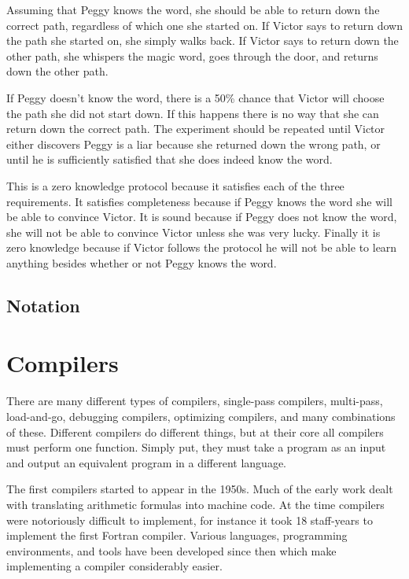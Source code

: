 \documentclass{sig-alternate}
\begin{document}
	Assuming that Peggy knows the word, she should be able to return down
	the correct path, regardless of which one she started on. If Victor 
	says to	return down the path she started on, she simply walks back. 
	If Victor says to return down the other path, she whispers the magic
	word, goes through the door, and returns down the other path.

	If Peggy doesn't know the word, there is a 50\% chance that Victor
	will choose the path she did not start down. If this happens there is
	no way that she can return down the correct path. The experiment should
	be repeated until Victor either discovers Peggy is a liar because she
	returned down the wrong path, or until he is sufficiently satisfied
	that she does indeed know the word.

	This is a zero knowledge protocol because it satisfies each of the three
	requirements. It satisfies completeness because	if Peggy knows the word
	she will be able to convince Victor. It is sound because if Peggy does not 
	know the word, she will not be able to convince Victor unless she was very
	lucky. Finally it is zero knowledge because if Victor follows the protocol
	he will not be able to learn anything besides whether or not Peggy knows 
	the word.
	
	\subsection{Notation}

\section{Compilers}
	There are many different types of compilers, single-pass compilers, multi-pass,
	load-and-go, debugging compilers, optimizing compilers, and many combinations
	of these. Different compilers do different things, but at their core all 
	compilers must perform one function. Simply put, they must take a program as 
	an input and output	an equivalent program in a different
	language.~\cite{Compiler:1986} 
	
	The first compilers started to appear in the 1950s. Much of the early work
	dealt with translating arithmetic formulas into machine code. At the time
	compilers were notoriously difficult to implement, for instance it took
	18 staff-years to implement the first Fortran compiler. Various languages,
	programming	environments, and tools have been developed since then which
	make implementing a compiler considerably easier.
	
\end{document}
